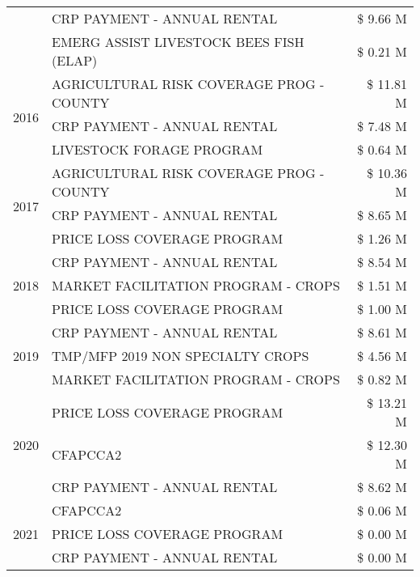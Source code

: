 \begin{tabular}{llr}
 & CRP PAYMENT - ANNUAL RENTAL & \$ 9.66 M \\
 & EMERG ASSIST LIVESTOCK BEES FISH (ELAP) & \$ 0.21 M \\
\cline{1-3}
\multirow[t]{3}{*}{2016} & AGRICULTURAL RISK COVERAGE PROG - COUNTY & \$ 11.81 M \\
 & CRP PAYMENT - ANNUAL RENTAL & \$ 7.48 M \\
 & LIVESTOCK FORAGE PROGRAM & \$ 0.64 M \\
\cline{1-3}
\multirow[t]{3}{*}{2017} & AGRICULTURAL RISK COVERAGE PROG - COUNTY & \$ 10.36 M \\
 & CRP PAYMENT - ANNUAL RENTAL & \$ 8.65 M \\
 & PRICE LOSS COVERAGE PROGRAM & \$ 1.26 M \\
\cline{1-3}
\multirow[t]{3}{*}{2018} & CRP PAYMENT - ANNUAL RENTAL & \$ 8.54 M \\
 & MARKET FACILITATION PROGRAM - CROPS & \$ 1.51 M \\
 & PRICE LOSS COVERAGE PROGRAM & \$ 1.00 M \\
\cline{1-3}
\multirow[t]{3}{*}{2019} & CRP PAYMENT - ANNUAL RENTAL & \$ 8.61 M \\
 & TMP/MFP 2019 NON SPECIALTY CROPS & \$ 4.56 M \\
 & MARKET FACILITATION PROGRAM - CROPS & \$ 0.82 M \\
\cline{1-3}
\multirow[t]{3}{*}{2020} & PRICE LOSS COVERAGE PROGRAM & \$ 13.21 M \\
 & CFAPCCA2 & \$ 12.30 M \\
 & CRP PAYMENT - ANNUAL RENTAL & \$ 8.62 M \\
\cline{1-3}
\multirow[t]{3}{*}{2021} & CFAPCCA2 & \$ 0.06 M \\
 & PRICE LOSS COVERAGE PROGRAM & \$ 0.00 M \\
 & CRP PAYMENT - ANNUAL RENTAL & \$ 0.00 M \\
\cline{1-3}
\bottomrule
\end{tabular}
